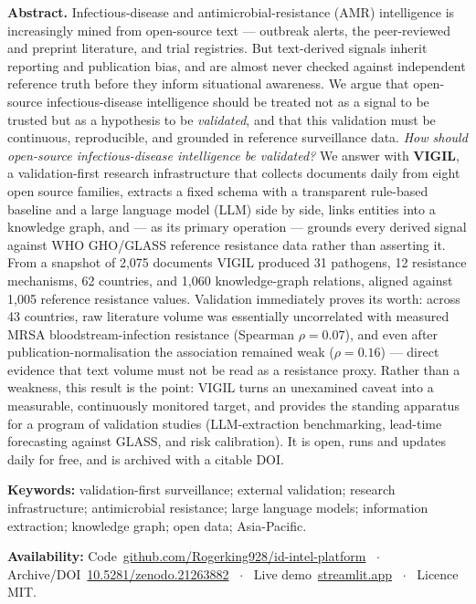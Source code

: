 \documentclass[10pt]{article}
\begin{document}
\begin{center}
\begin{minipage}{0.86\linewidth}
\small
\noindent\textbf{Abstract.}
Infectious-disease and antimicrobial-resistance (AMR) intelligence is increasingly
mined from open-source text --- outbreak alerts, the peer-reviewed and preprint
literature, and trial registries. But text-derived signals inherit reporting and
publication bias, and are almost never checked against independent reference truth
before they inform situational awareness. We argue that open-source
infectious-disease intelligence should be treated not as a signal to be trusted but
as a hypothesis to be \emph{validated}, and that this validation must be continuous,
reproducible, and grounded in reference surveillance data. \emph{How should
open-source infectious-disease intelligence be validated?} We answer with
\textbf{VIGIL}, a validation-first research infrastructure that collects documents
daily from eight open source families, extracts a fixed schema with a transparent
rule-based baseline and a large language model (LLM) side by side, links entities
into a knowledge graph, and --- as its primary operation --- grounds every derived
signal against WHO GHO/GLASS reference resistance data rather than asserting it. From
a snapshot of 2{,}075 documents VIGIL produced 31 pathogens, 12 resistance
mechanisms, 62 countries, and 1{,}060 knowledge-graph relations, aligned against
1{,}005 reference resistance values. Validation immediately proves its worth: across
43 countries, raw literature volume was essentially uncorrelated with measured MRSA
bloodstream-infection resistance (Spearman $\rho=0.07$), and even after
publication-normalisation the association remained weak ($\rho=0.16$) --- direct
evidence that text volume must not be read as a resistance proxy. Rather than a
weakness, this result is the point: VIGIL turns an unexamined caveat into a
measurable, continuously monitored target, and provides the standing apparatus for a
program of validation studies (LLM-extraction benchmarking, lead-time forecasting
against GLASS, and risk calibration). It is open, runs and updates daily for free,
and is archived with a citable DOI.

\vspace{0.5em}
\noindent\textbf{Keywords:} validation-first surveillance; external validation;
research infrastructure; antimicrobial resistance; large language models;
information extraction; knowledge graph; open data; Asia-Pacific.

\vspace{0.5em}
\noindent\textbf{Availability:}
Code~\href{https://github.com/Rogerking928/id-intel-platform}{github.com/Rogerking928/id-intel-platform}
~$\cdot$~ Archive/DOI~\href{https://doi.org/10.5281/zenodo.21263882}{10.5281/zenodo.21263882}
~$\cdot$~ Live demo~\href{https://id-intel-platform-4gkpazd4mhtj2upak5pzm9.streamlit.app/}{streamlit.app}
~$\cdot$~ Licence MIT.
\end{minipage}
\end{center}
\end{document}
